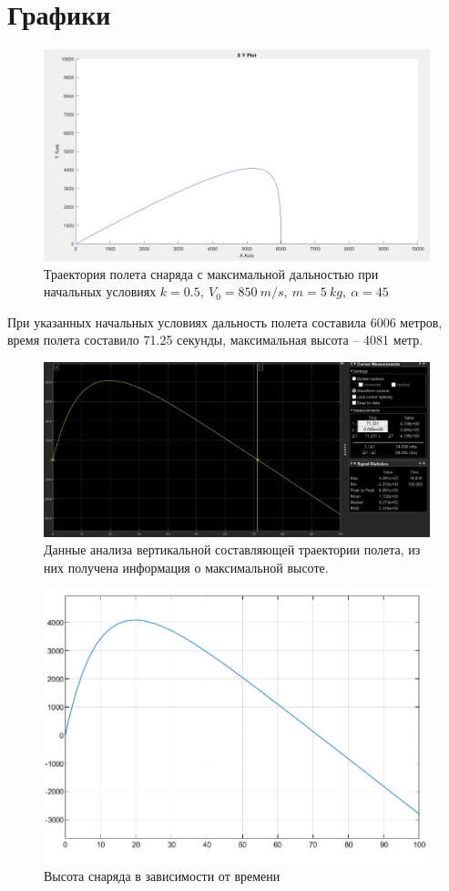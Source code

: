 \documentclass{article}
\begin{document}
	\section{Графики}
	\begin{figure}[H]
		\centering
		\includegraphics[width=0.7\linewidth]{graph1}
		\caption{Траектория полета снаряда с максимальной дальностью при начальных условиях $k=0.5,\ V_0 = 850\ m/s,\ m = 5\ kg,\ \alpha = 45$}
		\label{fig:graph1}
	\end{figure}
	При указанных начальных условиях дальность полета составила 6006 метров, время полета составило 71.25 секунды, максимальная высота -- 4081 метр.\\
	\begin{figure}[H]
		\centering
		\includegraphics[width=0.7\linewidth]{data1}
		\caption{Данные анализа вертикальной составляющей траектории полета, из них получена информация о максимальной высоте.}
		\label{fig:data1}
	\end{figure}
	\begin{figure}[H]
		\centering
		\includegraphics[width=0.7\linewidth]{graphy}
		\caption{Высота снаряда в зависимости от времени}
		\label{fig:graphvy}
	\end{figure}
\end{document}
